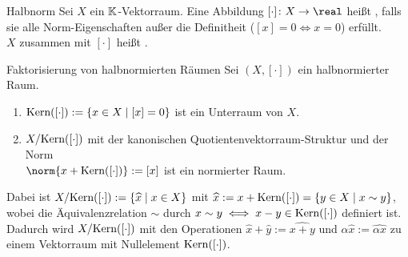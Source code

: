 \linie

\begin{Def}{Halbnorm}
    Sei $X$ ein $\mathbb{K}$-Vektorraum.
    Eine Abbildung $[\cdot]\colon X \rightarrow \real$ heißt ,
    falls sie alle Norm-Eigenschaften außer
    die Definitheit ($[x] = 0 \iff x = 0$) erfüllt.\\
    $X$ zusammen mit $[\cdot]$ heißt .
\end{Def}

\begin{Satz}{Faktorisierung von halbnormierten Räumen}
    Sei $(X, [\cdot])$ ein halbnormierter Raum.
    \begin{enumerate}
        \item
        $\text{Kern}([\cdot]) := \{x \in X \;|\; [x] = 0\}$ ist ein Unterraum von $X$.
        
        \item
        $X/\text{Kern}([\cdot])$ mit der kanonischen Quotientenvektorraum-Struktur und der Norm\\
        $\norm{x + \Kern([\cdot])} := [x]$ ist ein normierter Raum.
    \end{enumerate}
\end{Satz}

\begin{Bem}
    Dabei ist $X/\text{Kern}([\cdot]) := \{\widehat{x} \;|\; x \in X\}$
    mit $\widehat{x} := x + \text{Kern}([\cdot]) = \{y \in X \;|\; x \sim y\}$,
    wobei die Äquivalenzrelation $\sim$ durch
    $x \sim y \iff x - y \in \text{Kern}([\cdot])$ definiert ist.
    Dadurch wird $X/\text{Kern}([\cdot])$ mit den Operationen
    $\widehat{x} + \widehat{y} := \widehat{x + y}$ und
    $\alpha \widehat{x} := \widehat{\alpha x}$ zu einem Vektorraum mit
    Nullelement $\text{Kern}([\cdot])$.
\end{Bem}

\linie
\pagebreak

